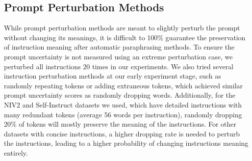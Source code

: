 \subsection{Prompt Perturbation Methods}
\label{subsec:prompt-perturb-meaning}
While prompt perturbation methods are meant to slightly perturb the prompt without changing its meanings, it is difficult to 100\% guarantee the preservation of instruction meaning after automatic paraphrasing methods. To ensure the prompt uncertainty is not measured using an extreme perturbation case, we perturbed all instructions 20 times in our experiments. We also tried several instruction perturbation methods at our early experiment stage, such as randomly repeating tokens or adding extraneous tokens, which achieved similar prompt uncertainty scores as randomly dropping words. Additionally, for the NIV2 and Self-Instruct datasets we used, which have detailed instructions with many redundant tokens (average 56 words per instruction), randomly dropping 20\% of tokens will mostly preserve the meaning of the instructions. For other datasets with concise instructions, a higher dropping rate is needed to perturb the instructions, leading to a higher probability of changing instructions meaning entirely.
